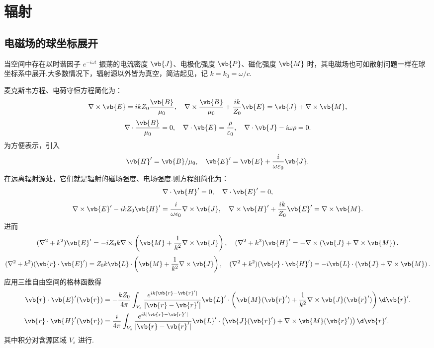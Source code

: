 
\section{辐射}

\subsection{电磁场的球坐标展开}

当空间中存在以时谐因子 \(e^{-i\omega t}\) 振荡的电流密度 \(\vb{J}\)、电极化强度 \(\vb{P}\)、磁化强度 \(\vb{M}\) 时，其电磁场也可如散射问题一样在球坐标系中展开.大多数情况下，辐射源以外皆为真空，简洁起见，记 \(k = k_0 = \omega/c\).

麦克斯韦方程、电荷守恒方程简化为：
\begin{equation*}
	\nabla \times \vb{E} = i k Z_0 \frac{\vb{B}}{\mu_0}, \quad
	\nabla \times \frac{\vb{B}}{\mu_0} + \frac{i k}{Z_0} \vb{E} = \vb{J} + \nabla \times \vb{M} ,
\end{equation*}
\begin{equation*}
	\nabla \cdot \frac{\vb{B}}{\mu_0} = 0, \quad \nabla \cdot \vb{E} = \frac{\rho}{\varepsilon_0}, \quad
	\nabla \cdot \vb{J} - i \omega \rho = 0.
\end{equation*}
为方便表示，引入
\begin{equation*}
	\vb{H}' = \vb{B}/\mu_0, \quad
	\vb{E}' = \vb{E} + \frac{i}{\omega \varepsilon_0} \vb{J}.
\end{equation*}
在远离辐射源处，它们就是辐射的磁场强度、电场强度.则方程组简化为：
\begin{equation*}
	\nabla \cdot \vb{H}' = 0, \quad \nabla \cdot \vb{E}' = 0,
\end{equation*}
\begin{equation*}
	\nabla \times \vb{E}' - i k Z_0 \vb{H}' = \frac{i}{\omega \epsilon_0} \nabla \times \vb{J}, \quad
	\nabla \times \vb{H}' + \frac{i k}{Z_0} \vb{E}' = \nabla \times \vb{M} .
\end{equation*}
进而
\begin{equation*}
	(\nabla^2 + k^2) \vb{E}' = -i Z_0 k \nabla \times \left( \vb{M} + \frac{1}{k^2} \nabla \times \vb{J} \right),\quad
	(\nabla^2 + k^2) \vb{H}' = -\nabla \times \left( \vb{J} + \nabla \times \vb{M} \right).
\end{equation*}
\begin{equation*}
	(\nabla^2 + k^2)(\vb{r} \cdot \vb{E}') = Z_0 k \vb{L} \cdot \left( \vb{M} + \frac{1}{k^2} \nabla \times \vb{J} \right),\quad
	(\nabla^2 + k^2)(\vb{r} \cdot \vb{H}') = -i \vb{L} \cdot \left( \vb{J} + \nabla \times \vb{M} \right).
\end{equation*}
应用三维自由空间的格林函数得
\begin{align*}
	\vb{r} \cdot \vb{E}'(\vb{r}) &= -\frac{k Z_0}{4 \pi} \int_{V_s} \frac{e^{i k |\vb{r} - \vb{r}'|}}{|\vb{r} - \vb{r}'|} \vb{L}' \cdot \left( \vb{M}(\vb{r}') + \frac{1}{k^2} \nabla \times \vb{J}(\vb{r}') \right) \d \vb{r}'.\\
	\vb{r} \cdot \vb{H}'(\vb{r}) &= \frac{i}{4 \pi} \int_{V_s} \frac{e^{i k |\vb{r} - \vb{r}'|}}{|\vb{r} - \vb{r}'|} \vb{L}' \cdot \left( \vb{J}(\vb{r}') + \nabla \times \vb{M}(\vb{r}') \right) \d \vb{r}'.
\end{align*}
其中积分对含源区域 \(V_s\) 进行.

